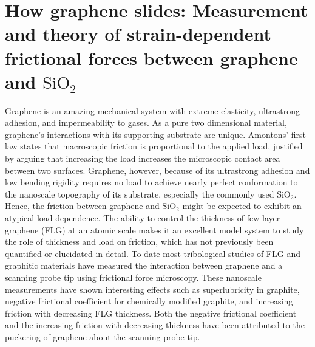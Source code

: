 \chapter{How graphene slides: Measurement and theory of strain-dependent frictional forces between graphene and $\mathrm{SiO_2}$}

Graphene is an amazing mechanical system with extreme elasticity\cite{Lee2008}, ultrastrong adhesion\cite{Koenig2011}, and impermeability to gases\cite{Bunch2008}.  As a pure two dimensional material, graphene's interactions with its supporting substrate are unique.  Amontons' first law states that macroscopic friction is proportional to the applied load, justified by arguing that increasing the load increases the microscopic contact area between two surfaces\cite{Krim1996}.  Graphene, however, because of its ultrastrong adhesion\cite{Koenig2011} and low bending rigidity requires no load to achieve nearly perfect conformation to the nanoscale topography of its substrate, especially the commonly used $\mathrm{SiO_2}$\cite{Stolyarova2007,Lui2009,Cullen2010}.  Hence, the friction between graphene and $\mathrm{SiO_2}$ might be expected to exhibit an atypical load dependence. The ability to control the thickness of few layer graphene (FLG) at an atomic scale makes it an excellent model system to study the role of thickness and load on friction, which has not previously been quantified or elucidated in detail.  To date most tribological studies of FLG and graphitic materials have measured the interaction between graphene and a scanning probe tip using frictional force microscopy\cite{Dienwiebel2004,Deng2012,Lee2010,Li2010c,Filleter2009,Filleter2010,Zhang2012a}.  These nanoscale measurements have shown interesting effects such as superlubricity in graphite\cite{Dienwiebel2004}, negative frictional coefficient for chemically modified graphite\cite{Deng2012}, and increasing friction with decreasing FLG thickness\cite{Lee2010,Li2010c,Filleter2009,Filleter2010}.  Both the negative frictional coefficient and the increasing friction with decreasing thickness have been attributed to the puckering of graphene about the scanning probe tip\cite{Lee2010,Li2010c,Deng2012}.

